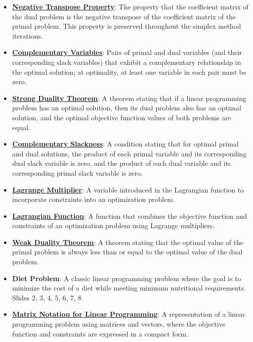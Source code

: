 \documentclass{article}%
\begin{document}
\begin{itemize}[leftmargin=*]
\item \href{https://www.math.purdue.edu/~yipn/421/2024-09-12-Duality.pdf#page=6}{\textbf{Negative Transpose Property}}: The property that the coefficient matrix of the dual problem is the negative transpose of the coefficient matrix of the primal problem. This property is preserved throughout the simplex method iterations.%
\item \href{https://www.math.purdue.edu/~yipn/421/2024-09-12-Duality.pdf#page=5}{\textbf{Complementary Variables}}: Pairs of primal and dual variables (and their corresponding slack variables) that exhibit a complementary relationship in the optimal solution; at optimality, at least one variable in each pair must be zero.%
\item \href{https://www.math.purdue.edu/~yipn/421/2024-09-12-Duality.pdf#page=11}{\textbf{Strong Duality Theorem}}: A theorem stating that if a linear programming problem has an optimal solution, then its dual problem also has an optimal solution, and the optimal objective function values of both problems are equal.%
\item \href{https://www.math.purdue.edu/~yipn/421/2024-09-12-Duality.pdf#page=21}{\textbf{Complementary Slackness}}: A condition stating that for optimal primal and dual solutions, the product of each primal variable and its corresponding dual slack variable is zero, and the product of each dual variable and its corresponding primal slack variable is zero.%
\item \href{https://www.math.purdue.edu/~yipn/421/2024-09-17-DualityGeneral.pdf#page=2}{\textbf{Lagrange Multiplier}}: A variable introduced in the Lagrangian function to incorporate constraints into an optimization problem.%
\item \href{https://www.math.purdue.edu/~yipn/421/2024-09-17-DualityGeneral.pdf#page=2}{\textbf{Lagrangian Function}}: A function that combines the objective function and constraints of an optimization problem using Lagrange multipliers.%
\item \href{https://www.math.purdue.edu/~yipn/421/2024-09-17-DualityGeneral.pdf#page=5}{\textbf{Weak Duality Theorem}}: A theorem stating that the optimal value of the primal problem is always less than or equal to the optimal value of the dual problem.%
\item \textbf{Diet Problem}: A classic linear programming problem where the goal is to minimize the cost of a diet while meeting minimum nutritional requirements. Slides 2, 3, 4, 5, 6, 7, 8%
\item \href{https://www.math.purdue.edu/~yipn/421/2024-09-24-SimplexMatrix.pdf#page=1}{\textbf{Matrix Notation for Linear Programming}}: A representation of a linear programming problem using matrices and vectors, where the objective function and constraints are expressed in a compact form.%

\end{itemize}
\end{document}
